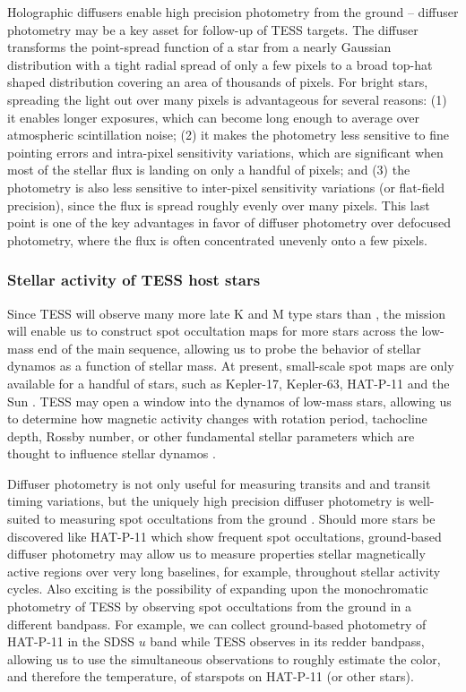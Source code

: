 Holographic diffusers enable high precision photometry from the ground \citep{Stefansson2017,Stefansson2018,Morris2018a} -- diffuser photometry may be a key asset for follow-up of TESS targets. The diffuser transforms the point-spread function of a star from a nearly Gaussian distribution with a tight radial spread of only a few pixels to a broad top-hat shaped distribution covering an area of thousands of pixels. For bright stars, spreading the light out over many pixels is advantageous for several reasons: (1) it enables longer exposures, which can become long enough to average over atmospheric scintillation noise; (2) it makes the photometry less sensitive to fine pointing errors and intra-pixel sensitivity variations, which are significant when most of the stellar flux is landing on only a handful of pixels; and (3) the photometry is also less sensitive to inter-pixel sensitivity variations (or flat-field precision), since the flux is spread roughly evenly over many pixels. This last point is one of the key advantages in favor of diffuser photometry over defocused photometry, where the flux is often concentrated unevenly onto a few pixels.

\subsubsection{Stellar activity of TESS host stars}

Since TESS will observe many more late K and M type stars than \kepler \citep{Muirhead2018}, the mission will enable us to construct spot occultation maps for more stars across the low-mass end of the main sequence, allowing us to probe the behavior of stellar dynamos as a function of stellar mass. At present, small-scale spot maps are only available for a handful of stars, such as Kepler-17, Kepler-63, HAT-P-11 and the Sun \citep{Solanki2003,davenportthesis,sanchis-ojeda2013,Morris2017a}. TESS may open a window into the dynamos of low-mass stars, allowing us to determine how magnetic activity changes with rotation period, tachocline depth, Rossby number, or other fundamental stellar parameters which are thought to influence stellar dynamos \citep{Berdyugina2005, Gilman2018}. 

Diffuser photometry is not only useful for measuring transits and and transit timing variations, but the uniquely high precision diffuser photometry is well-suited to measuring spot occultations from the ground \citep{Morris2018d}. Should more stars be discovered like HAT-P-11 which show frequent spot occultations, ground-based diffuser photometry may allow us to measure properties stellar magnetically active regions over very long baselines, for example, throughout stellar activity cycles. Also exciting is the possibility of expanding upon the monochromatic photometry of TESS by observing spot occultations from the ground in a different bandpass. For example, we can collect ground-based photometry of HAT-P-11 in the SDSS $u$ band while TESS observes in its redder bandpass, allowing us to use the simultaneous observations to roughly estimate the color, and therefore the temperature, of starspots on HAT-P-11 (or other stars). 

